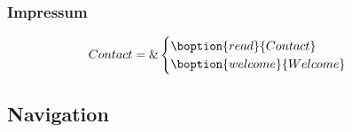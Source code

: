 \subsubsection{Impressum}
\label{sec:impressum}


\begin{align}
  Contact &= \& 
                \begin{cases}
                  \boption{read}{Contact}\\
                  \boption{welcome}{Welcome}
                \end{cases}
\end{align}



\subsection{Navigation}
\label{sec:navigation}




